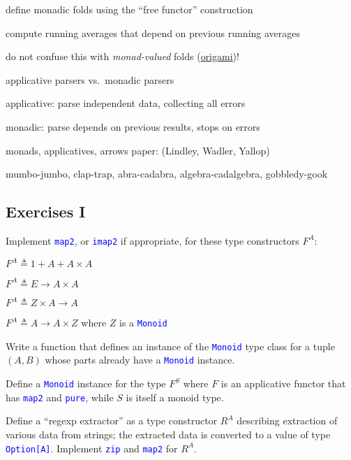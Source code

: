 define monadic folds using the ``free functor'' construction

compute running averages that depend on previous running averages

do not confuse this with \emph{monad-valued} folds (\href{https://github.com/atnos-org/origami}{origami})!

applicative parsers vs.\ monadic parsers

applicative: parse independent data, collecting all errors

monadic: parse depends on previous results, stops on errors

monads, applicatives, arrows paper: (Lindley, Wadler, Yallop) 

mumbo-jumbo, clap-trap, abra-cadabra, algebra-cadalgebra, gobbledy-gook


\subsection{Exercises I }

Implement \texttt{\textcolor{blue}{\footnotesize{}map2}}, or \texttt{\textcolor{blue}{\footnotesize{}imap2}}
if appropriate, for these type constructors $F^{A}$:

$F^{A}\triangleq1+A+A\times A$

$F^{A}\triangleq E\rightarrow A\times A$

$F^{A}\triangleq Z\times A\rightarrow A$ 

$F^{A}\triangleq A\rightarrow A\times Z$ where $Z$ is a \texttt{\textcolor{blue}{\footnotesize{}Monoid}} 

Write a function that defines an instance of the \texttt{\textcolor{blue}{\footnotesize{}Monoid}}
type class for a tuple $\left(A,B\right)$ whose parts already have
a \texttt{\textcolor{blue}{\footnotesize{}Monoid}} instance.

Define a \texttt{\textcolor{blue}{\footnotesize{}Monoid}} instance
for the type $F^{S}$ where $F$ is an applicative functor that has
\texttt{\textcolor{blue}{\footnotesize{}map2}} and \texttt{\textcolor{blue}{\footnotesize{}pure}},
while $S$ is itself a monoid type.

Define a ``regexp extractor'' as a type constructor $R^{A}$ describing
extraction of various data from strings; the extracted data is converted
to a value of type \texttt{\textcolor{blue}{\footnotesize{}Option{[}A{]}}}.
Implement \texttt{\textcolor{blue}{\footnotesize{}zip}} and \texttt{\textcolor{blue}{\footnotesize{}map2}}
for $R^{A}$.

